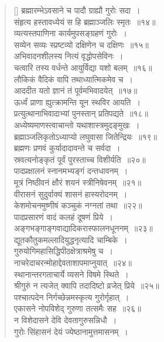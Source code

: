 \documentclass[twoside,12pt,notitlepage]{book}
\begin{document}
\begin{verse}[\versewidth]
ब्रह्मारम्भेऽवसाने च पादौ ग्राह्यौ गुरोः सदा~।\\[-6pt]
संहृत्य हस्तावध्येयं स हि ब्रह्माञ्जलिः स्मृतः~॥१४॥\footA \\
व्यत्यस्तपाणिना कार्यमुपसङ्ग्रहणं गुरोः~।\\[-6pt]
 सव्येन सव्यः स्प्रष्टव्यो दक्षिणेन च दक्षिणः~॥१५॥\footA \\
अभिवादनशीलस्य नित्यं वृद्धोपसेविनः~।\\[-6pt]
चत्वारि तस्य वर्धन्ते आयुर्विद्या यशो बलम्~॥१६॥\\
लौकिकं वैदिकं वापि तथाध्यात्मिकमेव च~।\\[-6pt]
आददीत यतो ज्ञानं तं पूर्वमभिवादयेत्~॥१७॥\\
ऊर्ध्वं प्राणा  ह्युत्क्रामन्ति यून स्थविर आयति~।\\[-6pt]
प्रत्युत्थानाभिवादाभ्यां पुनस्तान् प्रतिपद्यते~॥१८॥\footA \\
अध्येष्यमाणस्त्वाचान्तो यथाशास्त्रमुदङ्मुखः~।\\[-6pt]
ब्रह्माञ्जलिकृतोऽध्याप्यो लघुवासा जितेन्द्रियः~॥१९॥\footA \\
ब्रह्मणः प्रणवं कुर्यादादावन्ते च सर्वदा~।\\[-6pt]
स्रवत्यनोङ्कृतं पूर्वं पुरस्ताच्च विशीर्यति~॥२०॥\footA \\
पादप्रक्षालनं स्नानमभ्यङ्गं दन्तधावनम्~।\\[-6pt]
मूत्रं निष्ठीवनं क्षौरं शयनं स्त्रीनिषेवनम्~॥२१॥\\
वीरासनं सुदुर्वाक्यं शासनं हास्यरोदनम्~।\\[-6pt]
केशमोचनमुष्णीषं कञ्चुकं नग्नतां तथा~॥२२॥\\
पादप्रसारणं वादं कलहं दूषणं प्रिये~।\\[-6pt]
अङ्गभङ्गाङ्गवाद्यादिकरास्फालनधूननम्~॥२३॥\\
द्यूतकौतुकमल्लादियुद्धनृत्यादि चाम्बिके~।\\[-6pt]
गुरुयोगिमहासिद्धिपीठक्षेत्राश्रमेषु च~।\\[-6pt]
नाचरेदाचरन्मोहाद्देवताशापमाप्नुयात्~॥२४॥\footA \\
स्थानान्तरगताचार्ये व्यसने विषमे स्थिते~।\\[-6pt]
श्रीगुरुं न त्यजेत् क्वापि तदादिष्टो व्रजेत् प्रिये~॥२५॥\\
पश्चात्पदेन निर्गच्छेन्नमस्कृत्य गुरोर्गृहात्~।\\[-6pt]
एकासने नोपविशेद् गुरुणा तत्समैः सह~॥२६॥\\
न विशेदासने देवि देवतागुरुसन्निधौ~।\\[-6pt]
गुरोः सिंहासनं देयं ज्येष्ठानामुत्तमासनम्~।\\[-6pt]

\end{verse}
\end{document}
